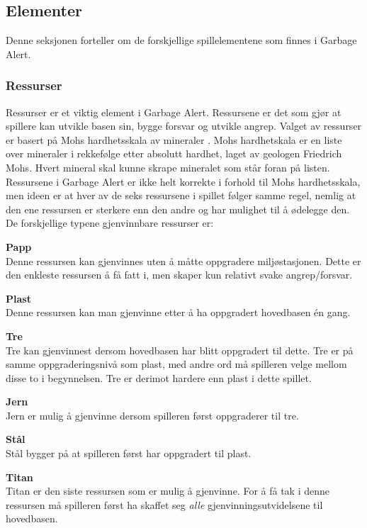 




\subsection{Elementer} \label{sec:spillelement}
Denne seksjonen forteller om de forskjellige spillelementene som finnes
i Garbage Alert.

\subsubsection{Ressurser}
Ressurser er et viktig element i Garbage Alert. Ressursene er det som
gjør at spillere kan utvikle basen sin, bygge forsvar og utvikle angrep.
Valget av ressurser er basert på Mohs hardhetsskala av mineraler \cite{mohs}. Mohs hardhetskala er en liste over mineraler i rekkefølge etter absolutt hardhet, laget av geologen Friedrich Mohs. Hvert mineral skal kunne skrape mineralet som står foran på listen. Ressursene i Garbage Alert er ikke helt korrekte i forhold til Mohs hardhetsskala, men ideen er at hver av de seks ressursene i spillet følger samme regel, nemlig at den ene ressursen er sterkere enn den andre og har mulighet til å ødelegge den. 
De forskjellige typene gjenvinnbare ressurser er:

\begin{description}
	\item \textbf{Papp}\\ Denne ressursen kan gjenvinnes uten å måtte oppgradere miljøstasjonen. Dette er den enkleste ressursen å få fatt i, men skaper kun relativt svake angrep/forsvar.
	\item \textbf{Plast}\\ Denne ressursen kan man gjenvinne etter å ha oppgradert hovedbasen én gang.
	\item \textbf{Tre}\\ Tre kan gjenvinnest dersom hovedbasen har blitt oppgradert til dette. Tre er på samme oppgraderingsnivå som plast, med andre ord må spilleren velge mellom disse to i begynnelsen. Tre er derimot hardere enn plast i dette spillet.
	\item \textbf{Jern}\\ Jern er mulig å gjenvinne dersom spilleren først oppgraderer til tre.
	\item \textbf{Stål}\\ Stål bygger på at spilleren først har oppgradert til plast.
	\item \textbf{Titan}\\ Titan er den siste ressursen som er mulig å gjenvinne. For å få tak i denne ressursen må spilleren først ha skaffet seg \emph{alle} gjenvinningsutvidelsene til hovedbasen.
\end{description}


